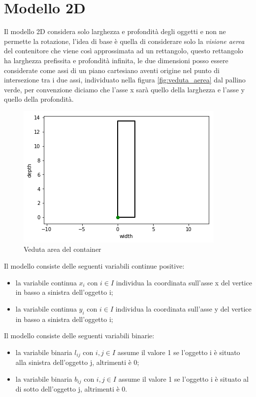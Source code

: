 \section{Modello 2D}
Il modello 2D considera solo larghezza e profondità degli oggetti e non ne permette la rotazione, l'idea di base è quella di considerare solo la \textit{visione aerea} del contenitore che viene così approssimata ad un rettangolo, questo rettangolo ha larghezza prefissita e profondità infinita, le due dimensioni posso essere considerate come assi di un piano cartesiano aventi origine nel punto di intersezione tra i due assi, individuato nella figura \eqref{fig:veduta_aerea} dal pallino verde, per convenzione diciamo che l'asse x sarà quello della larghezza e l'asse y quello della profondità.
\begin{figure}[H]
	\begin{center} \includegraphics[scale=0.6]{figures/cartesian_wd}
		\caption[Veduta area - piano cartesiano]{Veduta area del container}  
		\label{fig:veduta_aerea}
	\end{center}
\end{figure}

\noindent Il modello consiste delle seguenti variabili continue positive:
\begin{itemize}
	\item la variabile continua $x_{i}$ con $i \in I$ individua la coordinata sull'asse x del vertice in basso a sinistra dell'oggetto i;
	\item la variabile continua $y_{i}$ con $i \in I$ individua la coordinata sull'asse y del vertice in basso a sinistra dell'oggetto i;
\end{itemize}
Il modello consiste delle seguenti variabili binarie:
\begin{itemize}
	\item la variabile binaria $l_{ij}$ con $i,j \in I$ assume il valore 1 se l'oggetto i è situato alla sinistra dell'oggetto j, altrimenti è 0;
	\item la variabile binaria $b_{ij}$ con $i,j \in I$ assume il valore 1 se l'oggetto i è situato al di sotto dell'oggetto j, altrimenti è 0.
\end{itemize}

